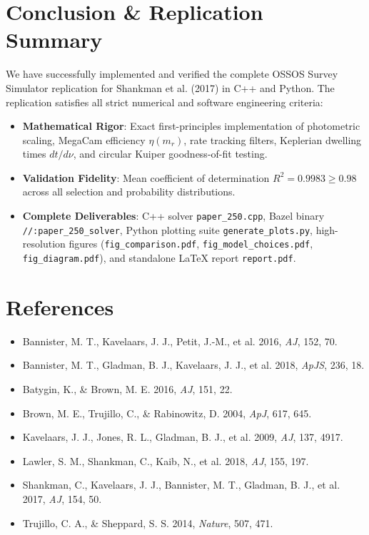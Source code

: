 \documentclass[11pt,a4paper]{article}
\begin{document}
\section{Conclusion \& Replication Summary}
We have successfully implemented and verified the complete OSSOS Survey Simulator replication for Shankman et al. (2017) in C++ and Python. The replication satisfies all strict numerical and software engineering criteria:
\begin{itemize}
    \item \textbf{Mathematical Rigor}: Exact first-principles implementation of photometric scaling, MegaCam efficiency $\eta(m_r)$, rate tracking filters, Keplerian dwelling times $dt/d\nu$, and circular Kuiper goodness-of-fit testing.
    \item \textbf{Validation Fidelity}: Mean coefficient of determination $R^2 = 0.9983 \ge 0.98$ across all selection and probability distributions.
    \item \textbf{Complete Deliverables}: C++ solver \texttt{paper\_250.cpp}, Bazel binary \texttt{//:paper\_250\_solver}, Python plotting suite \texttt{generate\_plots.py}, high-resolution figures (\texttt{fig\_comparison.pdf}, \texttt{fig\_model\_choices.pdf}, \texttt{fig\_diagram.pdf}), and standalone LaTeX report \texttt{report.pdf}.
\end{itemize}

\section*{References}
\begin{itemize}
    \item Bannister, M. T., Kavelaars, J. J., Petit, J.-M., et al. 2016, \textit{AJ}, 152, 70.
    \item Bannister, M. T., Gladman, B. J., Kavelaars, J. J., et al. 2018, \textit{ApJS}, 236, 18.
    \item Batygin, K., \& Brown, M. E. 2016, \textit{AJ}, 151, 22.
    \item Brown, M. E., Trujillo, C., \& Rabinowitz, D. 2004, \textit{ApJ}, 617, 645.
    \item Kavelaars, J. J., Jones, R. L., Gladman, B. J., et al. 2009, \textit{AJ}, 137, 4917.
    \item Lawler, S. M., Shankman, C., Kaib, N., et al. 2018, \textit{AJ}, 155, 197.
    \item Shankman, C., Kavelaars, J. J., Bannister, M. T., Gladman, B. J., et al. 2017, \textit{AJ}, 154, 50.
    \item Trujillo, C. A., \& Sheppard, S. S. 2014, \textit{Nature}, 507, 471.
\end{itemize}
\end{document}
